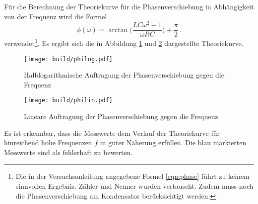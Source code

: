 Für die Berechnung der Theoriekurve für die Phasenverschiebung in Abhängigkeit
von der Frequenz wird die Formel
\begin{equation}
  \phi(\omega)=\arctan\biggl(\frac{L C \omega^2-1}{\omega R C}\biggr)+\frac{\pi}{2}\,.
\end{equation}
verwendet\footnote{Die in der Versuchsanleitung angegebene Formel \eqref{eqn:phase}
führt zu keinem sinnvollen Ergebnis. Zähler und Nenner wurden
vertauscht. Zudem muss noch die Phasenverschiebung am Kondensator berücksichtigt
werden.}.
Es ergibt sich die in Abbildung \ref{fig:philog2} und \ref{fig:philin2}
dargestellte Theoriekurve.


\begin{figure}
  \centering
  \texttt{[image: build/philog.pdf]}
  \caption{Halblogarithmische Auftragung der Phasenverschiebung gegen die Frequenz}
  \label{fig:philog2}
\end{figure}

\begin{figure}
  \centering
  \texttt{[image: build/philin.pdf]}
  \caption{Lineare Auftragung der Phasenverschiebung gegen die Frequenz}
  \label{fig:philin2}
\end{figure}

Es ist erkennbar, dass die Messwerte dem Verlauf der Theoriekurve für hinreichend
hohe Frequenzen $f$ in guter Näherung erfüllen. Die blau markierten Messwerte
sind als fehlerhaft zu bewerten.
